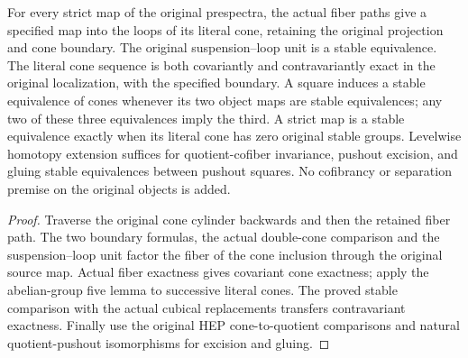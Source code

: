 \begin{proposition}
  For every strict map of the original prespectra, the actual fiber paths give a specified map into the loops of its literal cone, retaining the original projection and cone boundary. The original suspension--loop unit is a stable equivalence. The literal cone sequence is both covariantly and contravariantly exact in the original localization, with the specified boundary. A square induces a stable equivalence of cones whenever its two object maps are stable equivalences; any two of these three equivalences imply the third. A strict map is a stable equivalence exactly when its literal cone has zero original stable groups. Levelwise homotopy extension suffices for quotient-cofiber invariance, pushout excision, and gluing stable equivalences between pushout squares. No cofibrancy or separation premise on the original objects is added.
\end{proposition}
\begin{proof}
  Traverse the original cone cylinder backwards and then the retained fiber path. The two boundary formulas, the actual double-cone comparison and the suspension--loop unit factor the fiber of the cone inclusion through the original source map. Actual fiber exactness gives covariant cone exactness; apply the abelian-group five lemma to successive literal cones. The proved stable comparison with the actual cubical replacements transfers contravariant exactness. Finally use the original HEP cone-to-quotient comparisons and natural quotient-pushout isomorphisms for excision and gluing.
  \leanok
\end{proof}

